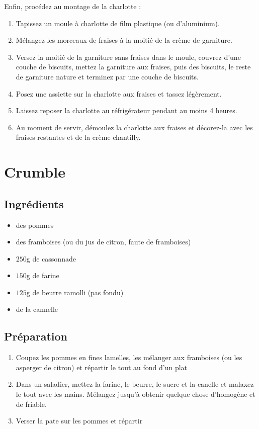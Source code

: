 Enfin, procédez au montage de la charlotte :

\begin{enumerate}
\item Tapissez un moule à charlotte de film plastique (ou d'aluminium).
\item Mélangez les morceaux de fraises à la moitié de la crème de garniture.
\item Versez la moitié de la garniture sans fraises dans le moule, couvrez d'une couche de biscuits, mettez la garniture aux fraises, puis des biscuits, le reste de garniture nature et terminez par une couche de biscuits.
\item Posez une assiette sur la charlotte aux fraises et tassez légèrement.
\item Laissez reposer la charlotte au réfrigérateur pendant au moins 4 heures.
\item Au moment de servir, démoulez la charlotte aux fraises et décorez-la avec les fraises restantes et de la crème chantilly.
\end{enumerate}

\newpage
\section{Crumble}
\subsection*{Ingrédients}
\begin{itemize}
\item des pommes
\item des framboises (ou du jus de citron, faute de framboises)
\item $250$g de cassonnade
\item $150$g de farine
\item $125$g de beurre ramolli (pas fondu)
\item de la cannelle
\end{itemize}

\subsection*{Préparation}
\begin{enumerate}
\item Coupez les pommes en fines lamelles, les mélanger aux framboises (ou les asperger de citron) et répartir le tout au fond d'un plat
\item Dans un saladier, mettez la farine, le beurre, le sucre et la canelle et malaxez le tout avec les mains. Mélangez jusqu'à obtenir quelque chose d'homogène et de friable.
\item Verser la pate sur les pommes et répartir
\end{enumerate}

